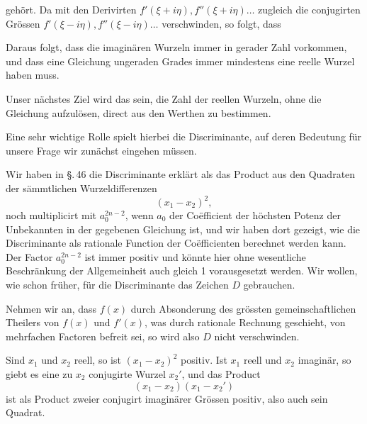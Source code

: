 gehört. Da mit den Derivirten $f'(\xi+i\eta), f''(\xi+i\eta)\ldots$ zugleich die conjugirten Grössen $f'(\xi-i\eta), f''(\xi-i\eta)\ldots$ verschwinden, so folgt, dass 

Daraus folgt, dass die imaginären Wurzeln immer in gerader Zahl vorkommen, und dass eine Gleichung ungeraden Grades immer mindestens eine reelle Wurzel haben muss.

Unser nächstes Ziel wird das sein, die Zahl der reellen Wurzeln, ohne die Gleichung aufzulösen, direct aus den Werthen  zu bestimmen.

Eine sehr wichtige Rolle spielt hierbei die Discriminante, auf deren Bedeutung für unsere Frage wir zunächst eingehen müssen.

Wir haben in \S.\,46 die Discriminante erklärt als das Product aus den Quadraten der sämmtlichen Wurzeldifferenzen
\[
(x_1 - x_2)^2,
\]
noch multiplicirt mit $a_0^{2n-2}$, wenn $a_0$ der Co\"efficient der höchsten Potenz der Unbekannten in der gegebenen Gleichung ist, und wir haben dort gezeigt, wie die Discriminante als rationale Function der Co\"efficienten berechnet werden kann. Der Factor $a_0^{2n-2}$ ist immer positiv und könnte hier ohne wesentliche Beschränkung der Allgemeinheit auch gleich 1 vorausgesetzt werden. Wir wollen, wie schon früher, für die Discriminante das Zeichen $D$ gebrauchen.


Nehmen wir an, dass $f(x)$ durch Absonderung des grössten gemeinschaftlichen Theilers von $f(x)$ und $f'(x)$, was durch rationale Rechnung geschieht, von mehrfachen Factoren befreit sei, so wird also $D$ nicht verschwinden.

Sind $x_1$ und $x_2$ reell, so ist $(x_1 - x_2)^2$ positiv. Ist $x_1$ reell und $x_2$ imaginär, so giebt es eine zu $x_2$ conjugirte Wurzel $x_2'$, und das Product
\[
(x_1 - x_2)(x_1 - x_2')
\]
ist als Product zweier conjugirt imaginärer Grössen positiv, also auch sein Quadrat.
